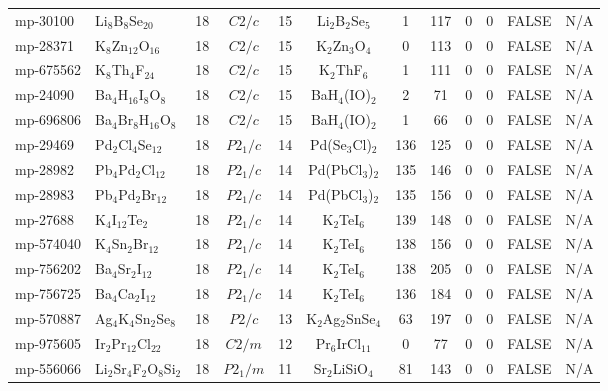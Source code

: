 {\begin{longtable}{llcccccccccc}
    mp-30100 & Li$_{8}$B$_{8}$Se$_{20}$ & 18    & $C2/c$ & 15    & Li$_{2}$B$_{2}$Se$_{5}$ & 1     & 117   & 0     & 0     & FALSE & N/A \\
    mp-28371 & K$_{8}$Zn$_{12}$O$_{16}$ & 18    & $C2/c$ & 15    & K$_{2}$Zn$_{3}$O$_{4}$ & 0     & 113   & 0     & 0     & FALSE & N/A \\
    mp-675562 & K$_{8}$Th$_{4}$F$_{24}$ & 18    & $C2/c$ & 15    & K$_{2}$ThF$_{6}$ & 1     & 111   & 0     & 0     & FALSE & N/A \\
    mp-24090 & Ba$_{4}$H$_{16}$I$_{8}$O$_{8}$ & 18    & $C2/c$ & 15    & BaH$_{4}$(IO)$_{2}$ & 2     & 71    & 0     & 0     & FALSE & N/A \\
    mp-696806 & Ba$_{4}$Br$_{8}$H$_{16}$O$_{8}$ & 18    & $C2/c$ & 15    & BaH$_{4}$(IO)$_{2}$ & 1     & 66    & 0     & 0     & FALSE & N/A \\
    mp-29469 & Pd$_{2}$Cl$_{4}$Se$_{12}$ & 18    & $P2_1/c$ & 14    & Pd(Se$_{3}$Cl)$_{2}$ & 136   & 125   & 0     & 0     & FALSE & N/A \\
    mp-28982 & Pb$_{4}$Pd$_{2}$Cl$_{12}$ & 18    & $P2_1/c$ & 14    & Pd(PbCl$_{3}$)$_{2}$ & 135   & 146   & 0     & 0     & FALSE & N/A \\
    mp-28983 & Pb$_{4}$Pd$_{2}$Br$_{12}$ & 18    & $P2_1/c$ & 14    & Pd(PbCl$_{3}$)$_{2}$ & 135   & 156   & 0     & 0     & FALSE & N/A \\
    mp-27688 & K$_{4}$I$_{12}$Te$_{2}$ & 18    & $P2_1/c$ & 14    & K$_{2}$TeI$_{6}$ & 139   & 148   & 0     & 0     & FALSE & N/A \\
    mp-574040 & K$_{4}$Sn$_{2}$Br$_{12}$ & 18    & $P2_1/c$ & 14    & K$_{2}$TeI$_{6}$ & 138   & 156   & 0     & 0     & FALSE & N/A \\
    mp-756202 & Ba$_{4}$Sr$_{2}$I$_{12}$ & 18    & $P2_1/c$ & 14    & K$_{2}$TeI$_{6}$ & 138   & 205   & 0     & 0     & FALSE & N/A \\
    mp-756725 & Ba$_{4}$Ca$_{2}$I$_{12}$ & 18    & $P2_1/c$ & 14    & K$_{2}$TeI$_{6}$ & 136   & 184   & 0     & 0     & FALSE & N/A \\
    mp-570887 & Ag$_{4}$K$_{4}$Sn$_{2}$Se$_{8}$ & 18    & $P2/c$ & 13    & K$_{2}$Ag$_{2}$SnSe$_{4}$ & 63    & 197   & 0     & 0     & FALSE & N/A \\
    mp-975605 & Ir$_{2}$Pr$_{12}$Cl$_{22}$ & 18    & $C2/m$ & 12    & Pr$_{6}$IrCl$_{11}$ & 0     & 77    & 0     & 0     & FALSE & N/A \\
    mp-556066 & Li$_{2}$Sr$_{4}$F$_{2}$O$_{8}$Si$_{2}$ & 18    & $P2_1/m$ & 11    & Sr$_{2}$LiSiO$_{4}$ & 81    & 143   & 0     & 0     & FALSE & N/A \\

\end{longtable}}
